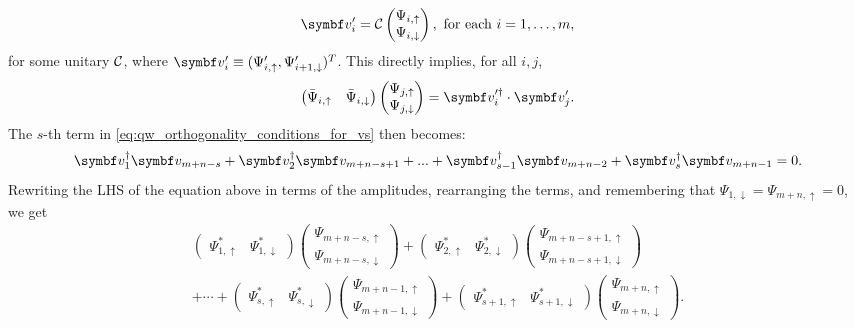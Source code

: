 \begin{equation*}
	\bs v_i^\prime
	= \mathcal C
	\begin{pmatrix}
		\Psi_{i,\uparrow} \\ \Psi_{i, \downarrow}
	\end{pmatrix},
	\text{ for each }
	i = 1, \dots, m,
\end{equation*}
for some unitary ${\mathcal{C}}$,
where $\bs v'_i \equiv (\Psi_{i,\uparrow}',\Psi_{i+1,\downarrow}')^T$.
This directly implies, for all $i, j$,
\begin{equation}
	\begin{pmatrix}
		\bar\Psi_{i, \uparrow} & \bar\Psi_{i, \downarrow}
	\end{pmatrix}
	\begin{pmatrix}
		\Psi_{j, \uparrow} \\ \Psi_{j, \downarrow}
	\end{pmatrix}
	=
	\bs v^{\prime\dagger}_{i} \cdot \bs v^\prime_j.
    \label{eq:qw_transition_us_to_vprimes}
\end{equation}
The $s$-th term in \cref{eq:qw_orthogonality_conditions_for_vs} then becomes:
\begin{equation*}
	\bs v_1^\dagger \bs v_{m+n-s}
	+ \bs v_2^\dagger \bs v_{m+n-s+1}
	+ ...
	+ \bs v_{s-1}^\dagger \bs v_{m+n-2}
    + \bs v_s^\dagger \bs v_{m+n-1} = 0.
\end{equation*}
Rewriting the LHS of the equation above in terms of the amplitudes, rearranging the terms, and remembering that $\Psi_{1, \downarrow} = \Psi_{m+n, \uparrow} = 0$, we get
\begin{equation*}
\begin{aligned}
	\begin{pmatrix}
		\Psi_{1, \uparrow}^* & \Psi_{1, \downarrow}^*
	\end{pmatrix}
	\begin{pmatrix}
		\Psi_{m+n-s, \uparrow} \\ \Psi_{m+n-s, \downarrow}
	\end{pmatrix}
	+
	\begin{pmatrix}
		\Psi_{2, \uparrow}^* & \Psi_{2, \downarrow}^*
	\end{pmatrix}
	\begin{pmatrix}
		\Psi_{m+n-s+1, \uparrow} \\ \Psi_{m+n-s+1, \downarrow}
	\end{pmatrix} \\
	+ \cdots + 
	\begin{pmatrix}
		\Psi_{s, \uparrow}^* & \Psi_{s, \downarrow}^*
	\end{pmatrix}
	\begin{pmatrix}
		\Psi_{m+n-1, \uparrow} \\ \Psi_{m+n-1, \downarrow}
	\end{pmatrix}
	+
	\begin{pmatrix}
		\Psi_{s+1, \uparrow}^* & \Psi_{s+1, \downarrow}^*
	\end{pmatrix}
	\begin{pmatrix}
		\Psi_{m+n, \uparrow} \\ \Psi_{m+n, \downarrow}
	\end{pmatrix}.
\end{aligned}
\end{equation*}
